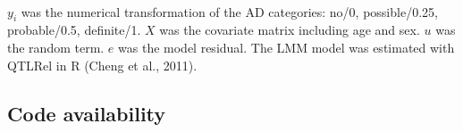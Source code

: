 \documentclass[12pt]{article}
\begin{document}
\paragraph{}{
$y_i$ was the numerical transformation of the AD categories: no/0, possible/0.25, probable/0.5, definite/1. $X$ was the covariate matrix including age and sex. $u$ was the random term. $e$ was the model residual. The LMM model was estimated with QTLRel in R (Cheng et al., 2011).
}

\subsection*{Code availability}
\end{document}
